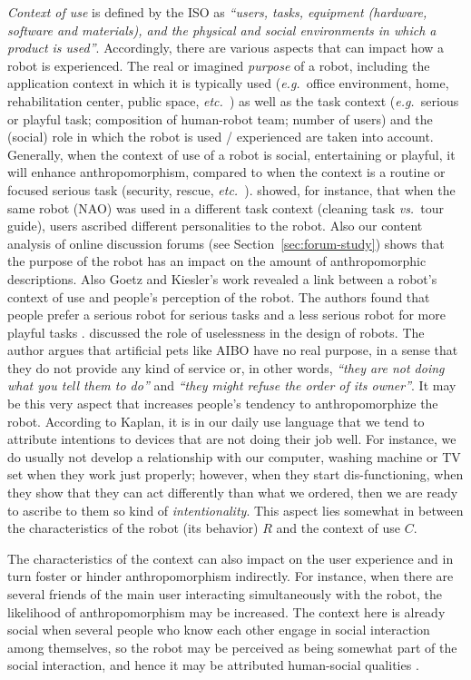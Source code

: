 \documentclass{frontiersSCNS} %
\newcommand{\eg}{{\textit{e.g.~}}}
\newcommand{\etc}{{\textit{etc.~}}}
\newcommand{\vs}{{\textit{vs.~}}}
\begin{document}
\textit{Context of use} is defined by the ISO as \textit{``users, tasks, equipment (hardware, software and materials), and the physical and social environments in which a product is used''}. Accordingly, there are various aspects that can impact how a robot is experienced. The real or imagined \textit{purpose} of a robot, including the application context in which it is typically used (\eg office environment, home, rehabilitation center, public space, \etc) as well as the task context (\eg serious or playful task; composition of human-robot team; number of users) and the (social) role in which the robot is used / experienced are taken into account. Generally, when the context of use of a robot is social, entertaining or playful, it will enhance anthropomorphism, compared to when the context is a routine or focused serious task (security, rescue, \etc). \cite{joosse_what_2013} showed, for instance, that when the same robot (NAO) was used in a different task context (cleaning task \vs tour guide), users ascribed different personalities to the robot. Also our content analysis of online discussion forums (see Section~\ref{sec:forum-study}) shows that the purpose of the robot has an impact on the amount of anthropomorphic descriptions. Also Goetz and Kiesler's work revealed a link between a robot's context of use and people's perception of the robot. The authors found that people prefer a serious robot for serious tasks and a less serious robot for more playful tasks \citep{goetz_cooperation_2002,goetz_matching_2003}. \cite{kaplan_free_2000} discussed the role of uselessness in the design of robots. The author argues that artificial pets like AIBO have no real purpose, in a sense that they do not provide any kind of service or, in other words, \textit{``they are not doing what you tell them to do''} and \textit{``they might refuse the order of its owner''}. It may be this very aspect that increases people's tendency to anthropomorphize the robot. According to Kaplan, it is in our daily use language that we tend to attribute intentions to devices that are not doing their job well. For instance, we do usually not develop a relationship with our computer, washing machine or TV set when they work just properly; however, when they start dis-functioning, when they show that they can act differently than what we ordered, then we are ready to ascribe to them so kind of \textit{intentionality}. This aspect lies somewhat in between the characteristics of the robot (its behavior) $R$ and the context of use $C$.

The characteristics of the context can also impact on the user experience and in turn foster or hinder anthropomorphism indirectly. For instance, when there are several friends of the main user interacting simultaneously with the robot, the likelihood of anthropomorphism may be increased. The context here is already social when several people who know each other engage in social interaction among themselves, so the robot may be perceived as being somewhat part of the social interaction, and hence it may be attributed human-social qualities \citep{baxter2013do}.
\end{document}
